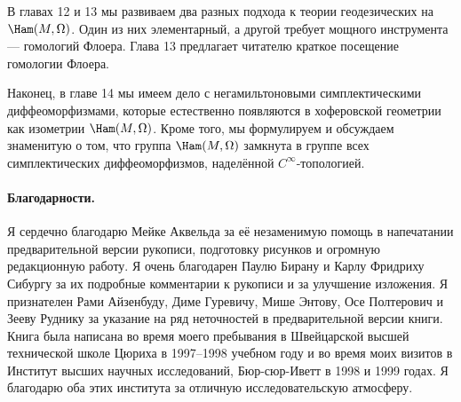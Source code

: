 В главах 12 и 13 мы развиваем два разных подхода к теории геодезических на $\Ham(M,\Omega)$.
Один из них элементарный, а другой требует мощного инструмента --- гомологий Флоера.
Глава 13 предлагает читателю краткое посещение гомологии Флоера.

Наконец, в главе 14 мы имеем дело с негамильтоновыми симплектическими диффеоморфизмами, которые естественно появляются в хоферовской геометрии как изометрии $\Ham(M,\Omega)$.
Кроме того, мы формулируем и обсуждаем знаменитую  о том, что группа $\Ham(M,\Omega)$ замкнута в группе всех симплектических диффеоморфизмов, наделённой $C^\infty$-топологией. 

\paragraph*{Благодарности.}
Я сердечно благодарю Мейке Аквельда за её незаменимую помощь в напечатании предварительной версии рукописи,
подготовку рисунков и огромную редакционную работу.
Я очень благодарен Паулю Бирану и Карлу Фридриху Сибургу за их подробные комментарии к рукописи и за улучшение изложения.
Я признателен Рами Айзенбуду, Диме Гуревичу, Мише Энтову, Осе Полтерович и Зееву Руднику за указание на ряд неточностей в предварительной версии книги.
Книга была написана во время моего пребывания в Швейцарской высшей технической школе Цюриха в 1997--1998 учебном году и во время моих визитов в Институт высших научных исследований, Бюр-сюр-Иветт в 1998 и 1999 годах.
Я благодарю оба этих института за отличную исследовательскую атмосферу. 
